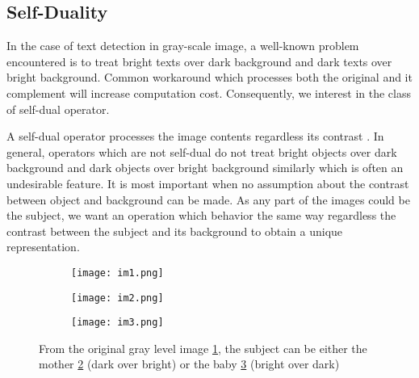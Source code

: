 \subsection{Self-Duality}
\par 
In the case of text detection in gray-scale image, a well-known problem encountered is to treat bright texts over dark background and dark texts over bright background. Common workaround which processes both the original and it complement will increase computation cost. Consequently, we interest in the class of self-dual operator.
\par
A self-dual operator processes the image contents regardless its contrast \cite{geraud.15.ismm}. In general, operators which are not self-dual do not treat bright objects over dark background and dark objects over bright background similarly which is often an undesirable feature. It is most important when no assumption about the contrast between object and background can be made. As any part of the images could be the subject, we want an operation which behavior the same way regardless the contrast between the subject and its background to obtain a unique representation.  
\begin{figure}

	\begin{subfigure}{0.3\textwidth}
	 	\texttt{[image: im1.png]} \caption{}\label{fig:gray} \end{subfigure}
	\begin{subfigure}{0.3\textwidth}
		\texttt{[image: im2.png]} \caption{}\label{fig:mother} \end{subfigure}
	\begin{subfigure}{0.3\textwidth}
		\texttt{[image: im3.png]} \caption{}\label{fig:baby} \end{subfigure}
	\centering
	\caption[Example of \textit{ subjects} can be either bright over dart or dart over bright] {From the original gray level image \ref{fig:gray}, the subject can be either the mother \ref{fig:mother} (dark over bright) or the baby \ref{fig:baby} (bright over dark) }
	\label{fig:motheAndBaby}
\end{figure}

